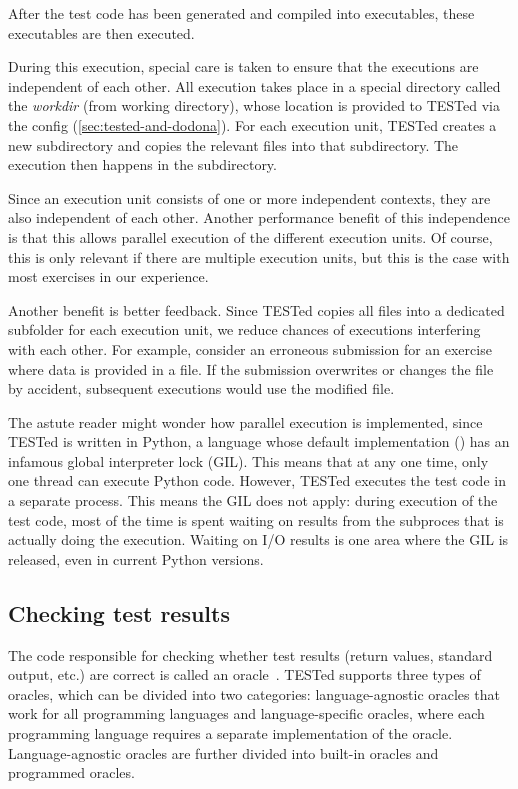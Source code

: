 \documentclass[../main]{subfiles}
\begin{document}
After the test code has been generated and compiled into executables, these executables are then executed.

During this execution, special care is taken to ensure that the executions are independent of each other.
All execution takes place in a special directory called the \emph{workdir} (from working directory), whose location is provided to TESTed via the config (\cref{sec:tested-and-dodona}).
For each execution unit, TESTed creates a new subdirectory and copies the relevant files into that subdirectory.
The execution then happens in the subdirectory.

Since an execution unit consists of one or more independent contexts, they are also independent of each other.
Another performance benefit of this independence is that this allows parallel execution of the different execution units.
Of course, this is only relevant if there are multiple execution units, but this is the case with most exercises in our experience.

Another benefit is better feedback.
Since TESTed copies all files into a dedicated subfolder for each execution unit, we reduce chances of executions interfering with each other.
For example, consider an erroneous submission for an exercise where data is provided in a file.
If the submission overwrites or changes the file by accident, subsequent executions would use the modified file.

The astute reader might wonder how parallel execution is implemented, since TESTed is written in Python, a language whose default implementation () has an infamous global interpreter lock (GIL).
This means that at any one time, only one thread can execute Python code.
However, TESTed executes the test code in a separate process.
This means the GIL does not apply: during execution of the test code, most of the time is spent waiting on results from the subproces that is actually doing the execution.
Waiting on I/O results is one area where the GIL is released, even in current Python versions.

\subsection{Checking test results}\label{subsec:checking-results}

The code responsible for checking whether test results (return values, standard output, etc.) are correct is called an oracle~\autocite{howdenTheoreticalEmpiricalStudies1978}.
TESTed supports three types of oracles, which can be divided into two categories: language-agnostic oracles that work for all programming languages and language-specific oracles, where each programming language requires a separate implementation of the oracle.
Language-agnostic oracles are further divided into built-in oracles and programmed oracles.
\end{document}

